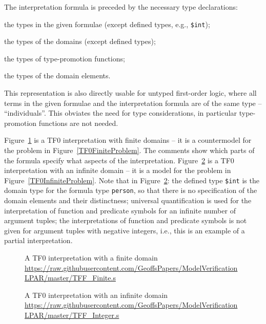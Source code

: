 \documentclass{easychair}
\newcommand{\smalltt}[1]{\small \texttt{#1}}
\newenvironment{packed_itemize}{
\vspace*{-0.2em}
\begin{itemize}
\setlength{\partopsep}{0pt}
\setlength{\itemsep}{1pt}
\setlength{\parskip}{0pt}
\setlength{\parsep}{0pt}
}{\end{itemize}}
\begin{document}
The interpretation formula is preceded by the necessary type declarations:
\begin{packed_itemize}
\item the types in the given formulae (except defined types, e.g., {\smalltt{\$int}});
\item the types of the domains (except defined types);
\item the types of type-promotion functions;
\item the types of the domain elements.
\end{packed_itemize}
This representation is also directly usable for untyped first-order logic, where all terms in 
the given formulae and the interpretation formula are of the same type – ``individuals''. 
This obviates the need for type considerations, in particular type-promotion functions are not 
needed.

Figure~\ref{TF0FiniteInterpretation} is a TF0 interpretation with finite domains -- it is a 
countermodel for the problem in Figure~\ref{TF0FiniteProblem}.
The comments show which parts of the formula specify what aspects of the interpretation.
Figure~\ref{TF0InfiniteInterpretation} is a TF0 interpretation with an infinite domain -- it 
is a model for the problem in Figure~\ref{TF0InfiniteProblem}.
Note that in Figure~\ref{TF0InfiniteInterpretation}:
the defined type {\smalltt{\$int}} is the domain type for the formula type 
{\smalltt{person}}, so that there is no specification of the domain elements and their 
distinctness;
universal quantification is used for the interpretation of function and predicate
symbols for an infinite number of argument tuples;
the interpretations of function and predicate symbols is not given for argument 
tuples with negative integers, i.e., this is an example of a partial interpretation.

\begin{figure}[htbp]
\small
{}

\caption{A TF0 interpretation with a finite domain \\
{\footnotesize \url{https://raw.githubusercontent.com/GeoffsPapers/ModelVerificationLPAR/master/TFF_Finite.s}}}
\label{TF0FiniteInterpretation}
\end{figure}

\begin{figure}[htbp]
\small
{}

\caption{A TF0 interpretation with an infinite domain\\
{\footnotesize \url{https://raw.githubusercontent.com/GeoffsPapers/ModelVerificationLPAR/master/TFF_Integer.s}}}
\label{TF0InfiniteInterpretation}
\end{figure}
\end{document}

